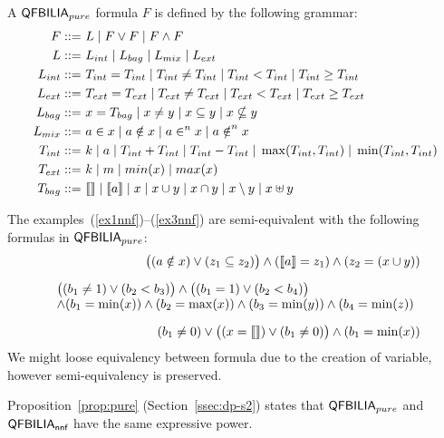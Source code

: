 \begin{mydef}
A $\textsf{QFBILIA}_{pure}$ formula $F$ is defined by the following grammar:
\begin{align*}
F ::= &\ L \; | \; F\lor F \; | \; F\land F
\\
L ::= &\ L_{int} \; |\; L_{bag} \; |\; L_{mix} \; |\; L_{ext}
\\
L_{int} ::= &\ T_{int} = T_{int} \; |\; T_{int} \neq T_{int} \; |\; T_{int} < T_{int}\; |\; T_{int} \ge T_{int}
\\
L_{ext} ::= &\ T_{ext} = T_{ext} \; |\; T_{ext} \neq T_{ext} \; |\; T_{ext} < T_{ext}\; |\; T_{ext} \ge T_{ext}
\\
L_{bag} ::= &\ x = T_{bag} \; |\;x \neq y \; |\;x \subseteq y \; |\;x \nsubseteq y
\\
L_{mix} ::= &\ a \in x\; |\;a \notin x\; |\;a \in^{n} x\; |\;a \notin^{n} x
\\
T_{int} ::= &\ k \;|\; a \;|\; T_{int} + T_{int} \;|\; T_{int} - T_{int}\;|\; \max(T_{int},T_{int})\;|\; \min(T_{int},T_{int})
\\
T_{ext} ::= &\ k \;|\; m \;|\; min(x) \;|\; max(x)
\\
T_{bag} ::= &\ \llbracket  \rrbracket\;|\;\llbracket a \rrbracket \;|\;x \;|\; x \cup y \;|\; x \cap y\;|\; x \setminus y\;|\; x \uplus y
\end{align*}
\end{mydef}

The examples~(\ref{ex1nnf})--(\ref{ex3nnf}) are semi-equivalent with the following formulas in $\textsf{QFBILIA}_{pure}$:
\begin{align}
\big((a \notin x) \lor (z_1 \subseteq z_2)\big) \land (\llbracket a \rrbracket = z_1) \land (z_2 = (x\cup y))
\label{ex1pure}
\\[2mm]
\begin{array}{l}
\big((b_1 \neq 1) \lor (b_2<b_3)\big) \land \big((b_1 = 1) \lor (b_2 < b_4)\big) \\
\land (b_1 = \min(x)) \land (b_2 = \max(x)) \land (b_3 = \min(y)) \land (b_4 = \min(z))
\end{array}
\label{ex2pure}
\\[2mm]
(b_1 \neq 0) \lor \big((x = \llbracket  \rrbracket) \lor (b_1 \neq 0)\big)
\land (b_1 = \min(x))
\label{ex3pure}
\end{align}
We might loose equivalency between formula due to the creation of variable, however semi-equivalency is preserved.

Proposition~\ref{prop:pure} (Section~\ref{ssec:dp-s2}) states that $\textsf{QFBILIA}_{pure}$ and $\textsf{QFBILIA}_{\textsf{nnf}}$ have the same expressive power.
